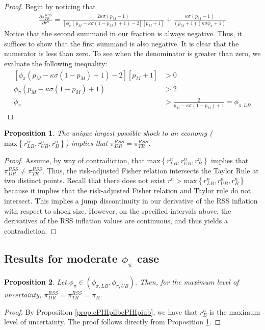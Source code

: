 \documentclass[11pt]{article}
\newtheorem{proposition}{Proposition}
\begin{document}
	\begin{proof}
		Begin by noticing that 
		\begin{align*}
			\frac{\partial \pi_{TR}^{RSS}}{\partial r^n} = \frac{2\kappa\sigma(p_M-1)}{\left[\phi_{\pi}(p_M - \kappa\sigma(1-p_M) + 1) - 2\right]\left[p_M + 1\right]} + \frac{\kappa\sigma(p_M-1)}{(p_M +1)(\kappa\sigma\phi_{\pi} + 1)}
		\end{align*}
		Notice that the second summand in our fraction is always negative. Thus, it suffices to show that the first summand is also negative. It is clear that the numerator is less than zero. To see when the denominator is greater than zero, we evaluate the following inequality: 
		\begin{align*}
			\left[\phi_{\pi}(p_M - \kappa\sigma(1-p_M) + 1) - 2\right]\left[p_M + 1\right] &> 0 \\
			\phi_{\pi}(p_M - \kappa\sigma(1-p_M) + 1) &> 2 \\
			\phi_{\pi} &> \frac{2}{p_M - \kappa\sigma(1-p_M) + 1}  = \phi_{\pi,LB}
		\end{align*} 	
	\end{proof}
	\begin{proposition}\label{prop:oneRSS}
		The unique largest possible shock to an economy ($\text{max}\left\{r^n_{LB}, r^n_{UB}, r^n_{B}\right\}$) implies that $\pi_{DR}^{RSS} = \pi_{TR}^{RSS}$.
	\end{proposition}
	\begin{proof}
		Assume, by way of contradiction, that $\text{max}\left\{r^n_{LB}, r^n_{UB}, r^n_{B}\right\}$ implies that $\pi_{DR}^{RSS} \ne \pi_{TR}^{RSS}$. Thus, the risk-adjusted Fisher relation intersects the Taylor Rule at two distinct points. Recall that there does not exist $r^n > \text{max}\left\{r^n_{LB}, r^n_{UB}, r^n_{B}\right\}$ because it implies that the risk-adjusted Fisher relation and Taylor rule do not intersect. This implies a jump discontinuity in our derivative of the RSS inflation with respect to shock size. However, on the specified intervals above, the derivatives of the RSS inflation values are continuous, and thus yields a contradiction.
	\end{proof}
	
	
\subsection{Results for moderate $\phi_{\pi}$ case}	

	\begin{proposition}
		Let $\phi_{\pi}\in(\phi_{\pi,LB},\phi_{\pi,UB})$. Then, for the maximum level of uncertainty, $\pi_{DR}^{RSS} = \pi_{TR}^{RSS} = \pi_{B}$. 
	\end{proposition}
	\begin{proof}
		By Proposition \ref{prop:cPHIpilbcPHIpiub}, we have that $r^n_B$ is the maximum level of uncertainty. The proof follows directly from Proposition \ref{prop:oneRSS}.
	\end{proof}
	
\end{document}
